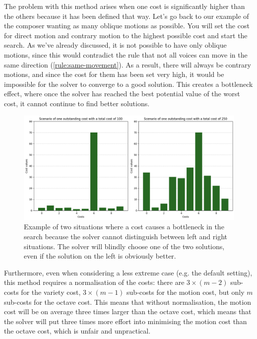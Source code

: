 The problem with this method arises when one cost is significantly higher than the others because it has been defined that way. Let's go back to our example of the composer wanting as many oblique motions as possible. You will set the cost for direct motion and contrary motion to the highest possible cost and start the search. As we've already discussed, it is not possible to have only oblique motions, since this would contradict the rule that not all voices can move in the same direction (\ref{rule:same-movement}). As a result, there will always be contrary motions, and since the cost for them has been set very high, it would be impossible for the solver to converge to a good solution. This creates a bottleneck effect, where once the solver has reached the best potential value of the worst cost, it cannot continue to find better solutions. 

\begin{figure}[h]
    \centering
    \includegraphics[width=1\textwidth]{Images/minimising-maxima.png}
    \caption{Example of two situations where a cost causes a bottleneck in the search because the solver cannot distinguish between left and right situations. The solver will blindly choose one of the two solutions, even if the solution on the left is obviously better.}
    \label{fig:bottleneck}
\end{figure}


Furthermore, even when considering a less extreme case (e.g. the default setting), this method requires a normalisation of the costs: there are $3\times (m-2)$ sub-costs for the variety cost, $3\times (m-1)$ sub-costs for the motion cost, but only $m$ sub-costs for the octave cost. This means that without normalisation, the motion cost will be on average three times larger than the octave cost, which means that the solver will put three times more effort into minimising the motion cost than the octave cost, which is unfair and unpractical.


